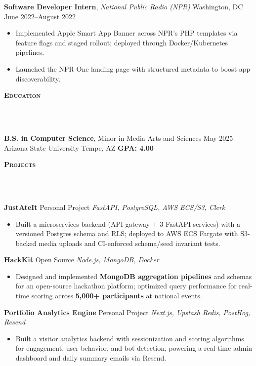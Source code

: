 \documentclass[10pt]{article}
\newcommand{\lineunder} {
    \vspace*{-10pt} \\
    \hspace*{-18pt} \hrulefill \\
    \vspace*{2pt}
}
\newcommand{\header} [1] {
  \vspace*{2pt}
    {\hspace*{-15pt}\textsc{#1}}
    \lineunder
}
\begin{document}
\textbf{Software Developer Intern}, \textit{National Public Radio (NPR)} \hfill Washington, DC \textbar{} June 2022--August 2022\\
\begin{itemize}[leftmargin=5mm, itemsep=0mm]
  \item Implemented Apple Smart App Banner across NPR's PHP templates via feature flags and staged rollout; deployed through Docker/Kubernetes pipelines.
  \item Launched the NPR One landing page with structured metadata to boost app discoverability.
\end{itemize}

\header{\textbf{Education}}
\textbf{B.S. in Computer Science}, Minor in Media Arts and Sciences \hfill May 2025\\
Arizona State University \hfill Tempe, AZ \textbar{} \textbf{GPA: 4.00}

\header{\textbf{Projects}}

\textbf{JustAteIt} \hfill Personal Project \textbar{} \textit{FastAPI, PostgreSQL, AWS ECS/S3, Clerk}
\vspace{-1mm}
\begin{itemize}[leftmargin=5mm, itemsep=0mm]
  \item Built a microservices backend (API gateway + 3 FastAPI services) with a versioned Postgres schema and RLS; deployed to AWS ECS Fargate with S3-backed media uploads and CI-enforced schema/seed invariant tests.
\end{itemize}

\textbf{HackKit} \hfill Open Source \textbar{} \textit{Node.js, MongoDB, Docker}
\begin{itemize}[leftmargin=5mm, itemsep=0mm]
  \item Designed and implemented \textbf{MongoDB aggregation pipelines} and schemas for an open-source hackathon platform; optimized query performance for real-time scoring across \textbf{5{,}000+ participants} at national events.
\end{itemize}

\textbf{Portfolio Analytics Engine} \hfill Personal Project \textbar{} \textit{Next.js, Upstash Redis, PostHog, Resend}
\vspace{-1mm}
\begin{itemize}[leftmargin=5mm, itemsep=0mm]
  \item Built a visitor analytics backend with sessionization and scoring algorithms for engagement, user behavior, and bot detection, powering a real-time admin dashboard and daily summary emails via Resend.
\end{itemize}
\end{document}
